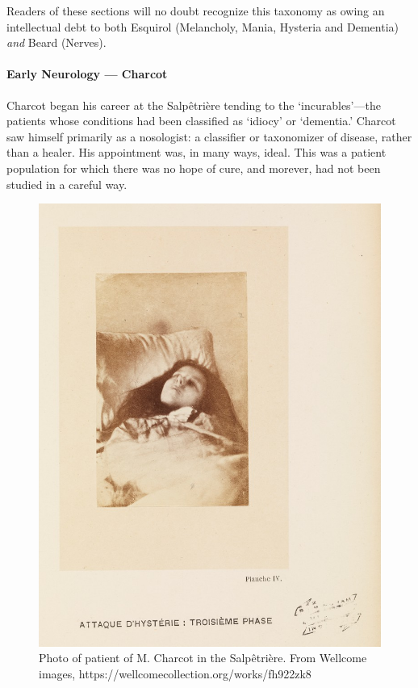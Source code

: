 Readers of these sections will no doubt recognize this taxonomy as owing an intellectual debt to both Esquirol (Melancholy, Mania, Hysteria and Dementia) \emph{and} Beard (Nerves).

\paragraph{Early Neurology --- Charcot}
\label{earlyneurology---charcot}

Charcot began his career at the Salpêtrière tending to the `incurables'---the patients whose conditions had been classified as `idiocy' or `dementia.' Charcot saw himself primarily as a nosologist: a classifier or taxonomizer of disease, rather than a healer. His appointment was, in many ways, ideal. This was a patient population for which there was no hope of cure, and morever, had not been studied in a careful way. 

\begin{figure}[h]
 \centering

 \includegraphics{../images/hysterie-troisiemephase.jpg}
 \caption{Photo of patient of M. Charcot in the Salpêtrière. From Wellcome images, https://wellcomecollection.org/works/fh922zk8 }
\label{fig: charcotpatient}
\end{figure}


